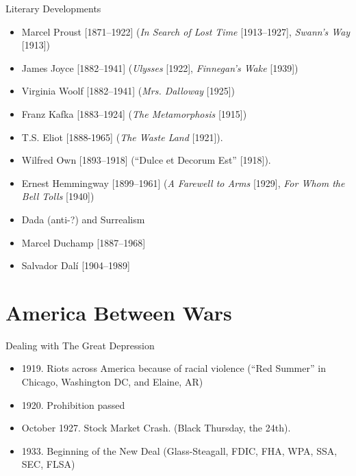 \begin{frame}{Literary Developments}
	\begin{itemize}
		\item<1-10>Marcel Proust [1871--1922] (\emph{In Search of Lost Time} [1913--1927], \emph{Swann's Way} [1913])
		\item<2-10>James Joyce [1882--1941] (\emph{Ulysses} [1922], \emph{Finnegan's Wake} [1939])
		\item<3-10>Virginia Woolf [1882--1941] (\emph{Mrs. Dalloway} [1925])
		\item<4-10>Franz Kafka [1883--1924] (\emph{The Metamorphosis} [1915])
		\item<5-10>T.S. Eliot [1888-1965] (\emph{The Waste Land} [1921]).
		\item<6-10>Wilfred Own [1893--1918] (``Dulce et Decorum Est'' [1918]).
		\item<7-10>Ernest Hemmingway [1899--1961] (\emph{A Farewell to Arms} [1929], \emph{For Whom the Bell Tolls} [1940])
		\item<8-10>Dada (anti-?) and Surrealism
		\item<9-10>Marcel Duchamp [1887--1968]
		\item<10>Salvador Dal{\'i} [1904--1989]
	\end{itemize}
\end{frame}

\section{America Between Wars}
\begin{frame}{Dealing with The Great Depression}
	\begin{itemize}
		\item<+->1919. Riots across America because of racial violence (``Red Summer'' in Chicago, Washington DC, and Elaine, AR)
		\item<+->1920. Prohibition passed
		\item<+->October 1927. Stock Market Crash. (Black Thursday, the 24th).
		\item<+->1933. Beginning of the New Deal (Glass-Steagall, FDIC, FHA, WPA, SSA, SEC, FLSA)
	\end{itemize}
\end{frame}

